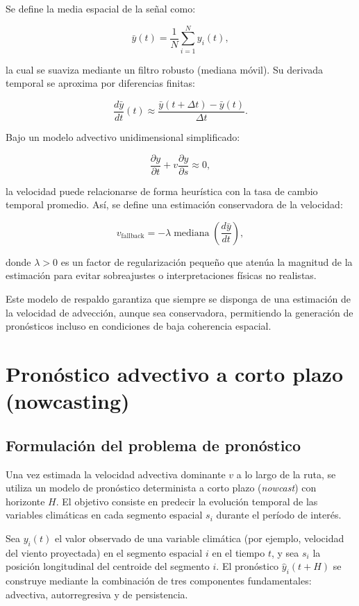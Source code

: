 \documentclass[
  spanish,
  us-letterpaper,
]{scrreprt}
\numberwithin{equation}{section}
\begin{document}
Se define la media espacial de la señal como:

\[
\bar{y}(t) = \frac{1}{N} \sum_{i=1}^{N} y_i(t),
\]

la cual se suaviza mediante un filtro robusto (mediana móvil). Su
derivada temporal se aproxima por diferencias finitas:

\[
\frac{d\bar{y}}{dt}(t) \approx \frac{\bar{y}(t+\Delta t)-\bar{y}(t)}{\Delta t}.
\]

Bajo un modelo advectivo unidimensional simplificado:

\[
\frac{\partial y}{\partial t} + v \frac{\partial y}{\partial s} \approx 0,
\]

la velocidad puede relacionarse de forma heurística con la tasa de
cambio temporal promedio. Así, se define una estimación conservadora de
la velocidad:

\[
v_{\text{fallback}} = -\lambda \operatorname{mediana}\left( \frac{d\bar{y}}{dt} \right),
\]

donde \(\lambda > 0\) es un factor de regularización pequeño que atenúa
la magnitud de la estimación para evitar sobreajustes o interpretaciones
físicas no realistas.

Este modelo de respaldo garantiza que siempre se disponga de una
estimación de la velocidad de advección, aunque sea conservadora,
permitiendo la generación de pronósticos incluso en condiciones de baja
coherencia espacial.

\section{Pronóstico advectivo a corto plazo
(nowcasting)}\label{sec-pronosticoadvectivo}

\subsection{Formulación del problema de
pronóstico}\label{formulaciuxf3n-del-problema-de-pronuxf3stico}

Una vez estimada la velocidad advectiva dominante \(v\) a lo largo de la
ruta, se utiliza un modelo de pronóstico determinista a corto plazo
(\emph{nowcast}) con horizonte \(H\). El objetivo consiste en predecir
la evolución temporal de las variables climáticas en cada segmento
espacial \(s_i\) durante el período de interés.

Sea \(y_i(t)\) el valor observado de una variable climática (por
ejemplo, velocidad del viento proyectada) en el segmento espacial \(i\)
en el tiempo \(t\), y sea \(s_i\) la posición longitudinal del centroide
del segmento \(i\). El pronóstico \(\hat{y}_i(t+H)\) se construye
mediante la combinación de tres componentes fundamentales: advectiva,
autorregresiva y de persistencia.
\end{document}

